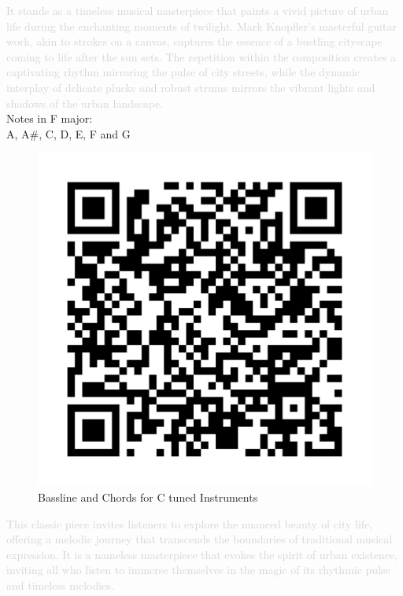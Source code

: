 \textcolor{lightgray}{It stands as a timeless musical masterpiece that paints a vivid picture of urban life during the enchanting moments of twilight. Mark Knopfler's masterful guitar work, akin to strokes on a canvas, captures the essence of a bustling cityscape coming to life after the sun sets. The repetition within the composition creates a captivating rhythm mirroring the pulse of city streets, while the dynamic interplay of delicate plucks and robust strums mirrors the vibrant lights and shadows of the urban landscape.}\\
Notes in F major:\\
A, A\#, C, D, E, F and G\\
\begin{figure}
\includegraphics[width=1\linewidth]{QR_Codes/QR_SultansOfSwing_BassChords.png}\\
Bassline and Chords for C tuned Instruments
\end{figure}
\textcolor{lightgray}{This classic piece invites listeners to explore the nuanced beauty of city life, offering a melodic journey that transcends the boundaries of traditional musical expression. It is a nameless masterpiece that evokes the spirit of urban existence, inviting all who listen to immerse themselves in the magic of its rhythmic pulse and timeless melodies.}\\

